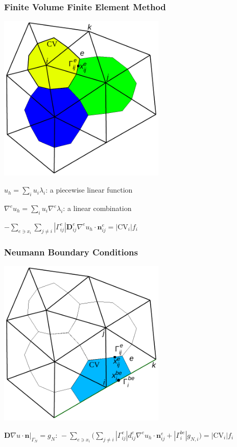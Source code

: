 \documentclass[xcolor=dvipsnames]{beamer}
\begin{document}
\begin {frame} [t]
\frametitle{Finite Volume Finite Element Method}
\centerline{\includegraphics [width=0.6\textwidth] {FV-Elem-Donald.pdf}}
{%
\centerline{$\displaystyle u_h = \sum_i u_i \lambda_i$: a piecewise linear function}
}%
{%
\centerline{$\displaystyle \nabla^e u_h = \sum_i u_i \nabla^e \lambda_i$: a linear combination}
}%
{%
\centerline{$\displaystyle - \sum_{e \ni x_i} \sum_{j \ne i} | \Gamma^e_{ij} | \mathbf{D}^e_{ij} \nabla^e u_h \cdot \mathbf{n}^e_{ij} = | \mathrm{CV}_i | f_i$}
}%
\end {frame}

\begin{frame} [t]
\frametitle {Neumann Boundary Conditions}
\centerline{\includegraphics [width=0.6\textwidth] {FV-Elem-Donald-bnd.pdf}}
\centerline{%
$
 \left .  \mathbf{D} \nabla u \cdot \mathbf{n} \right |_{\Gamma_N} = g_N: \,
 \displaystyle
 - \sum_{e \ni x_i}
  \bigl (
   \sum_{j \ne i} | \Gamma^e_{ij} | d^e_{ij} \nabla^e u_h \cdot \mathbf{n}^e_{ij}
   +
   | \Gamma^{be}_{i} | g_{N,i}
  \bigr )
 = | \mathrm{CV}_i | f_i
$%
}
\end{frame}
\end{document}
